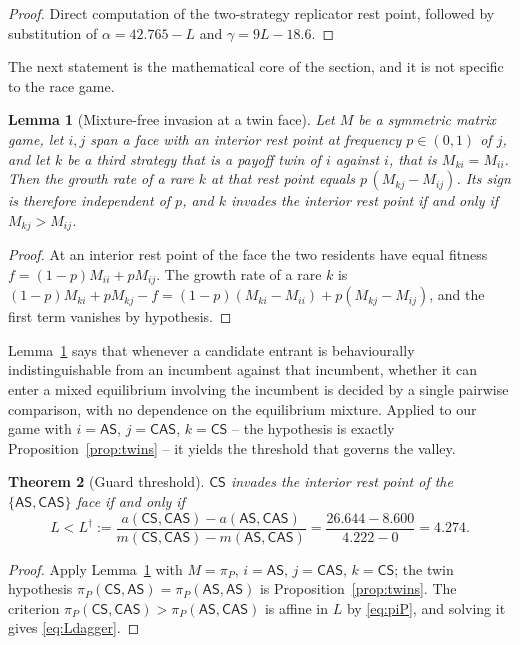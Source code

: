 \documentclass[11pt,a4paper]{article}
\newtheorem{theorem}{Theorem}
\newtheorem{lemma}[theorem]{Lemma}
\theoremstyle{definition}
\newcommand{\AS}{\textsf{AS}}
\newcommand{\CS}{\textsf{CS}}
\newcommand{\CAS}{\textsf{CAS}}
\newcommand{\piP}{\pi_{P}}
\begin{document}
\begin{proof}
Direct computation of the two-strategy replicator rest point, followed by
substitution of $\alpha=42.765-L$ and $\gamma=9L-18.6$.
\end{proof}

The next statement is the mathematical core of the section, and it is not
specific to the race game.

\begin{lemma}[Mixture-free invasion at a twin face]\label{lem:twin}
Let $M$ be a symmetric matrix game, let $i,j$ span a face with an interior
rest point at frequency $p\in(0,1)$ of $j$, and let $k$ be a third strategy
that is a payoff twin of $i$ against $i$, that is $M_{ki}=M_{ii}$. Then the
growth rate of a rare $k$ at that rest point equals
$p\,(M_{kj}-M_{ij})$. Its sign is therefore independent of $p$, and $k$
invades the interior rest point if and only if $M_{kj}>M_{ij}$.
\end{lemma}

\begin{proof}
At an interior rest point of the face the two residents have equal fitness
$f=(1-p)M_{ii}+pM_{ij}$. The growth rate of a rare $k$ is
$(1-p)M_{ki}+pM_{kj}-f=(1-p)(M_{ki}-M_{ii})+p(M_{kj}-M_{ij})$, and the first
term vanishes by hypothesis.
\end{proof}

Lemma~\ref{lem:twin} says that whenever a candidate entrant is behaviourally
indistinguishable from an incumbent against that incumbent, whether it can
enter a mixed equilibrium involving the incumbent is decided by a single
pairwise comparison, with no dependence on the equilibrium mixture. Applied to
our game with $i=\AS$, $j=\CAS$, $k=\CS$ -- the hypothesis is exactly
Proposition~\ref{prop:twins} -- it yields the threshold that governs the
valley.

\begin{theorem}[Guard threshold]\label{thm:guard}
$\CS$ invades the interior rest point of the $\{\AS,\CAS\}$ face if and only
if
\begin{equation}
L<L^{\dagger}:=\frac{a(\CS,\CAS)-a(\AS,\CAS)}{m(\CS,\CAS)-m(\AS,\CAS)}
=\frac{26.644-8.600}{4.222-0}=4.274 .
\label{eq:Ldagger}
\end{equation}
\end{theorem}

\begin{proof}
Apply Lemma~\ref{lem:twin} with $M=\piP$, $i=\AS$, $j=\CAS$, $k=\CS$; the twin
hypothesis $\piP(\CS,\AS)=\piP(\AS,\AS)$ is Proposition~\ref{prop:twins}. The
criterion $\piP(\CS,\CAS)>\piP(\AS,\CAS)$ is affine in $L$ by \eqref{eq:piP},
and solving it gives \eqref{eq:Ldagger}.
\end{proof}
\end{document}
